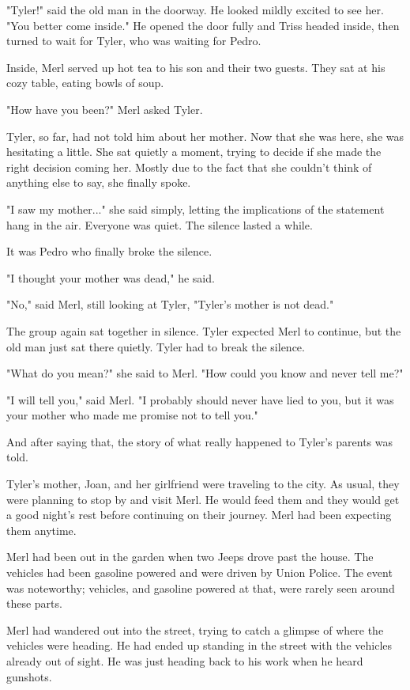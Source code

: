 \documentclass[courier]{sffms}
\begin{document}
"Tyler!" said the old man in the doorway.
He looked mildly excited to see her. "You better
come inside." He opened the door fully and Triss headed
inside, then turned to wait for Tyler, who was waiting
for Pedro.

Inside, Merl served up hot tea to his son and their
two guests. They sat at his cozy table, eating bowls of
soup.

"How have you been?" Merl asked Tyler.

Tyler, so far, had not told him about her mother. Now
that she was here, she was hesitating a little. She sat
quietly a moment, trying to decide if she made the
right decision coming her. Mostly due to the fact that
she couldn't think of anything else to say, she finally
spoke.

"I saw my mother..." she said simply, letting the
implications of the statement hang in the air. Everyone
was quiet. The silence lasted a while.

It was Pedro who finally broke the silence.

"I thought your mother was dead," he said.

"No," said Merl, still looking at Tyler, "Tyler's
mother is not dead."

The group again sat together in silence. Tyler
expected Merl to continue, but the old man
just sat there quietly. Tyler had to break the
silence.

"What do you mean?" she said to Merl. "How
could you know and never tell me?"

"I will tell you," said Merl. 
"I probably should never have lied
to you, but it was your mother who made me
promise not to tell you."

And after saying that, the story of what really
happened to Tyler's parents was told.

Tyler's mother, Joan, and her girlfriend were
traveling to the city. As usual, they were planning
to stop by and visit Merl. He would feed them
and they would get a good night's rest before
continuing on their journey. Merl had been
expecting them anytime.

Merl had been out in the garden when two
Jeeps drove past the house. The vehicles had
been gasoline powered and were driven by
Union Police. The event was noteworthy;
vehicles, and gasoline powered at that, were
rarely seen around these parts.

Merl had wandered out into the street, trying
to catch a glimpse of where the vehicles were
heading. He had ended up standing in the street
with the vehicles already out of sight. He was just
heading back to his work when he heard gunshots.
\end{document}
